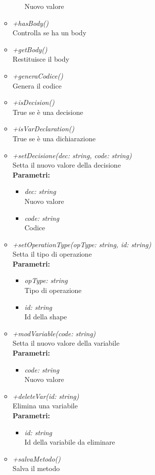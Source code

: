 \begin{itemize}
\begin{itemize}
\begin{itemize}
    			Nuovo valore
    		\end{itemize}
    		\item \emph{+hasBody()}\\
    		Controlla se ha un body
    		\item \emph{+getBody()}\\
    		Restituisce il body
    		\item \emph{+generaCodice()}\\
    		Genera il codice
    		\item \emph{+isDecision()}\\
    		True se è una decisione
    		\item \emph{+isVarDeclaration()}\\
    		True se è una dichiarazione
    		\item \emph{+setDecisione(dec: string, code: string)}\\
    		Setta il nuovo valore della decisione\\
    		\textbf{Parametri:}
    		\begin{itemize}
    			\item \emph{dec: string}\\
    			Nuovo valore
    			\item \emph{code: string}\\
    			Codice
    		\end{itemize}
    		\item \emph{+setOperationType(opType: string, id: string)}\\
    		Setta il tipo di operazione\\
    		\textbf{Parametri:}
    		\begin{itemize}
    			\item \emph{opType: string}\\
    			Tipo di operazione
    			\item \emph{id: string}\\
    			Id della shape
    		\end{itemize}
    		\item \emph{+modVariable(code: string)}\\
    		Setta il nuovo valore della variabile\\
    		\textbf{Parametri:}
    		\begin{itemize}
    			\item \emph{code: string}\\
    			Nuovo valore
    		\end{itemize}
    		\item \emph{+deleteVar(id: string)}\\
    		Elimina una variabile\\
    		\textbf{Parametri:}
    		\begin{itemize}
    			\item \emph{id: string}\\
    			Id della variabile da eliminare
    		\end{itemize}
    		\item \emph{+salvaMetodo()}\\
    		Salva il metodo
		\end{itemize}
\end{itemize}